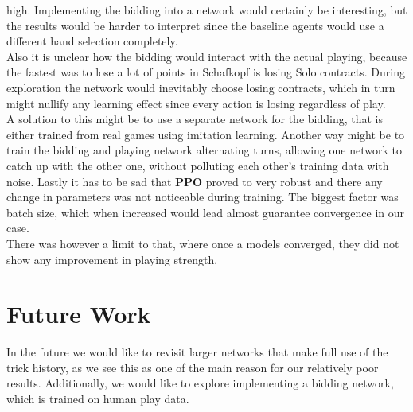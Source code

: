 high.
\newline
Implementing the bidding into a network would certainly be interesting, but the results would be harder to interpret
since the baseline agents would use a different hand selection completely.\\
Also it is unclear how the bidding would interact with the actual playing, because the fastest was to lose a lot of
points in Schafkopf is losing Solo contracts.
During exploration the network would inevitably choose losing contracts, which in turn might nullify any learning
effect since every action is losing regardless of play.\\
A solution to this might be to use a separate network for the bidding, that is either trained from real games using
imitation learning.
Another way might be to train the bidding and playing network alternating turns, allowing one network to catch up
with the other one, without polluting each other's training data with noise.
\newline
Lastly it has to be sad that \textbf{PPO} proved to very robust and there any change in parameters was not
noticeable during training.
The biggest factor was batch size, which when increased would lead almost guarantee convergence in our case.\\
There was however a limit to that, where once a models converged, they did not show any improvement in playing strength.


\section{Future Work}
In the future we would like to revisit larger networks that make full use of the trick history, as we see this as one
of the main reason for our relatively poor results.
Additionally, we would like to explore implementing a bidding network, which is trained on human play data.
